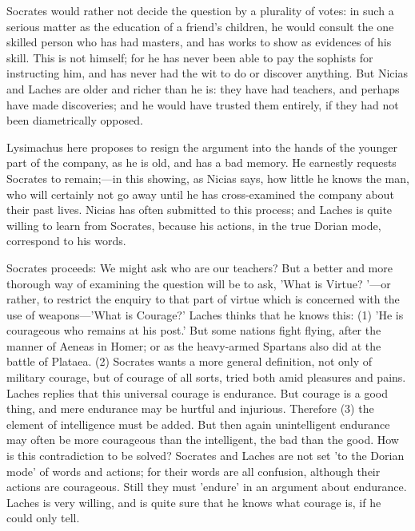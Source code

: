 \documentclass[11pt,letter]{book}
\begin{document}
\par  Socrates would rather not decide the question by a plurality of votes: in such a serious matter as the education of a friend's children, he would consult the one skilled person who has had masters, and has works to show as evidences of his skill. This is not himself; for he has never been able to pay the sophists for instructing him, and has never had the wit to do or discover anything. But Nicias and Laches are older and richer than he is: they have had teachers, and perhaps have made discoveries; and he would have trusted them entirely, if they had not been diametrically opposed.

\par  Lysimachus here proposes to resign the argument into the hands of the younger part of the company, as he is old, and has a bad memory. He earnestly requests Socrates to remain;—in this showing, as Nicias says, how little he knows the man, who will certainly not go away until he has cross-examined the company about their past lives. Nicias has often submitted to this process; and Laches is quite willing to learn from Socrates, because his actions, in the true Dorian mode, correspond to his words.

\par  Socrates proceeds: We might ask who are our teachers? But a better and more thorough way of examining the question will be to ask, 'What is Virtue? '—or rather, to restrict the enquiry to that part of virtue which is concerned with the use of weapons—'What is Courage?' Laches thinks that he knows this: (1) 'He is courageous who remains at his post.' But some nations fight flying, after the manner of Aeneas in Homer; or as the heavy-armed Spartans also did at the battle of Plataea. (2) Socrates wants a more general definition, not only of military courage, but of courage of all sorts, tried both amid pleasures and pains. Laches replies that this universal courage is endurance. But courage is a good thing, and mere endurance may be hurtful and injurious. Therefore (3) the element of intelligence must be added. But then again unintelligent endurance may often be more courageous than the intelligent, the bad than the good. How is this contradiction to be solved? Socrates and Laches are not set 'to the Dorian mode' of words and actions; for their words are all confusion, although their actions are courageous. Still they must 'endure' in an argument about endurance. Laches is very willing, and is quite sure that he knows what courage is, if he could only tell.
\end{document}
